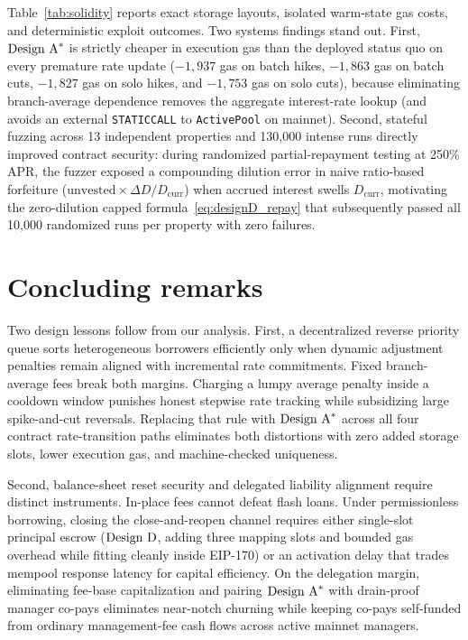 Table~\ref{tab:solidity} reports exact storage layouts, isolated warm-state gas costs, and deterministic exploit outcomes. Two systems findings stand out. First, $\textup{Design A}^*$ is strictly cheaper in execution gas than the deployed status quo on every premature rate update ($-1{,}937$ gas on batch hikes, $-1{,}863$ gas on batch cuts, $-1{,}827$ gas on solo hikes, and $-1{,}753$ gas on solo cuts), because eliminating branch-average dependence removes the aggregate interest-rate lookup (and avoids an external \texttt{STATICCALL} to \texttt{ActivePool} on mainnet). Second, stateful fuzzing across 13 independent properties and 130,000 intense runs directly improved contract security: during randomized partial-repayment testing at 250\% APR, the fuzzer exposed a compounding dilution error in naive ratio-based forfeiture ($\mathrm{unvested} \times \Delta D / D_{\mathrm{curr}}$) when accrued interest swells $D_{\mathrm{curr}}$, motivating the zero-dilution capped formula~\eqref{eq:designD_repay} that subsequently passed all 10,000 randomized runs per property with zero failures.

\section{Concluding remarks}\label{sec:conclusion}

Two design lessons follow from our analysis. First, a decentralized reverse priority queue sorts heterogeneous borrowers efficiently only when dynamic adjustment penalties remain aligned with incremental rate commitments. Fixed branch-average fees break both margins. Charging a lumpy average penalty inside a cooldown window punishes honest stepwise rate tracking while subsidizing large spike-and-cut reversals. Replacing that rule with $\textup{Design A}^*$ across all four contract rate-transition paths eliminates both distortions with zero added storage slots, lower execution gas, and machine-checked uniqueness.

Second, balance-sheet reset security and delegated liability alignment require distinct instruments. In-place fees cannot defeat flash loans. Under permissionless borrowing, closing the close-and-reopen channel requires either single-slot principal escrow ($\textup{Design D}$, adding three mapping slots and bounded gas overhead while fitting cleanly inside EIP-170) or an activation delay that trades mempool response latency for capital efficiency. On the delegation margin, eliminating fee-base capitalization and pairing $\textup{Design A}^*$ with drain-proof manager co-pays eliminates near-notch churning while keeping co-pays self-funded from ordinary management-fee cash flows across active mainnet managers.

